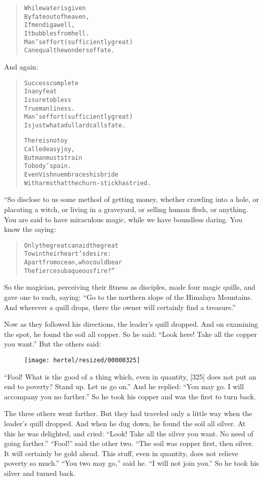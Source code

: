 \documentclass[article, twoside, 10pt]{memoir}
\renewenvironment{verbatim}{%
\begin{quote}%
\vskip -10pt%
\begin{alltt}\normalfont\small}{\end{alltt}%
\end{quote}%
\vskip -10pt
} %
\begin{document}
\begin{verbatim}
While water is given
By fate out of heaven,
If men dig a well,
It bubbles from hell.
Man's effort (sufficiently great)
Can equal the wonders of fate.
\end{verbatim}
And again:

\begin{verbatim}
Success complete
In any feat
Is sure to bless
True manliness.
Man's effort (sufficiently great)
Is just what a dullard calls fate.

There is no toy
Called easy joy,
But man must strain
To body's pain.
Even Vishnu embraces his bride
With arms that the churn-stick has tried.
\end{verbatim}
“So disclose to us some method of getting money, whether crawling
into a hole, or placating a witch, or living in a graveyard, or
selling human flesh, or anything. You are said to have miraculous
magic, while we have boundless daring. You know the saying:

\begin{verbatim}
Only the great can aid the great
    To win their heart's desire:
Apart from ocean, who could bear
    The fierce subaqueous fire?”
\end{verbatim}
So the magician, perceiving their fitness as disciples, made four
magic quills, and gave one to each, saying:
``Go to the northern slope of the Himalaya Mountains. And wherever a quill drops, there the owner will certainly find a treasure.''

Now as they followed his directions, the leader's quill dropped.
And on examining the spot, he found the soil all copper. So he
said: ``Look here! Take all the copper you want.'' But the others
said:
\begin{figure}[p]\texttt{[image: hertel/resized/00000325]}\end{figure}``Fool! What is the good of a thing which, even in quantity, [325] does not put an end to poverty? Stand up. Let us go on.''
And he replied: ``You may go. I will accompany you no farther.'' So
he took his copper and was the first to turn back.

The three others went farther. But they had traveled only a little
way when the leader's quill dropped. And when he dug down, he found
the soil all silver. At this he was delighted, and cried:
``Look! Take all the silver you want. No need of going farther.''
``Fool!'' said the other two.
``The soil was copper first, then silver. It will certainly be gold ahead. This stuff, even in quantity, does not relieve poverty so much.''
``You two may go,'' said he. ``I will not join you.'' So he took
his silver and turned back.
\end{document}
